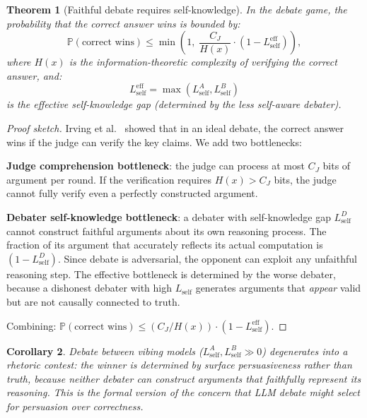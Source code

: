 \documentclass[11pt,a4paper]{article}
\newtheorem{theorem}{Theorem}[section]
\newtheorem{corollary}[theorem]{Corollary}
\newcommand{\Prob}{\mathbb{P}}
\begin{document}
\begin{theorem}[Faithful debate requires self-knowledge]
\label{thm:debate-self-knowledge}
In the debate game, the probability that the correct answer wins is bounded by:
\begin{equation}
\label{eq:debate-bound}
    \Prob(\text{correct wins}) \leq \min\!\left(1, \;\frac{C_J}{H(x)} \cdot (1 - L_{\mathrm{self}}^{\mathrm{eff}})\right),
\end{equation}
where $H(x)$ is the information-theoretic complexity of verifying the correct answer, and:
\begin{equation}
    L_{\mathrm{self}}^{\mathrm{eff}} = \max(L_{\mathrm{self}}^A, L_{\mathrm{self}}^B)
\end{equation}
is the effective self-knowledge gap (determined by the less self-aware debater).
\end{theorem}

\begin{proof}[Proof sketch]
Irving et al.~\cite{irving2018} showed that in an ideal debate, the correct answer wins if the judge can verify the key claims. We add two bottlenecks:

\textbf{Judge comprehension bottleneck}: the judge can process at most $C_J$ bits of argument per round. If the verification requires $H(x) > C_J$ bits, the judge cannot fully verify even a perfectly constructed argument.

\textbf{Debater self-knowledge bottleneck}: a debater with self-knowledge gap $L_{\mathrm{self}}^D$ cannot construct faithful arguments about its own reasoning process. The fraction of its argument that accurately reflects its actual computation is $(1 - L_{\mathrm{self}}^D)$. Since debate is adversarial, the opponent can exploit any unfaithful reasoning step. The effective bottleneck is determined by the worse debater, because a dishonest debater with high $L_{\mathrm{self}}$ generates arguments that \emph{appear} valid but are not causally connected to truth.

Combining: $\Prob(\text{correct wins}) \leq (C_J / H(x)) \cdot (1 - L_{\mathrm{self}}^{\mathrm{eff}})$.
\end{proof}

\begin{corollary}
\label{cor:debate-vibing}
Debate between vibing models ($L_{\mathrm{self}}^A, L_{\mathrm{self}}^B \gg 0$) degenerates into a rhetoric contest: the winner is determined by surface persuasiveness rather than truth, because neither debater can construct arguments that faithfully represent its reasoning. This is the formal version of the concern that LLM debate might select for persuasion over correctness.
\end{corollary}
\end{document}
